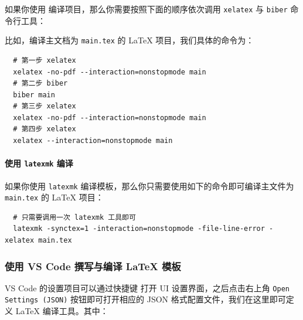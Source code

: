 如果你使用  编译项目，那么你需要按照下面的顺序依次调用 \texttt{xelatex} 与 \texttt{biber} 命令行工具：

\begin{center}
\end{center}

比如，编译主文档为 \texttt{main.tex} 的 {\LaTeX} 项目，我们具体的命令为：

\begin{verbatim}
  # 第一步 xelatex
  xelatex -no-pdf --interaction=nonstopmode main
  # 第二步 biber
  biber main
  # 第三步 xelatex
  xelatex -no-pdf --interaction=nonstopmode main
  # 第四步 xelatex
  xelatex --interaction=nonstopmode main
\end{verbatim}

\paragraph{使用 \texttt{latexmk} 编译}

如果你使用 \texttt{latexmk} 编译模板，那么你只需要使用如下的命令即可编译主文件为 \texttt{main.tex} 的 {\LaTeX} 项目：

\begin{verbatim}
  # 只需要调用一次 latexmk 工具即可
  latexmk -synctex=1 -interaction=nonstopmode -file-line-error -xelatex main.tex
\end{verbatim}

\subsubsection{使用 VS Code 撰写与编译 {\LaTeX} 模板}

VS Code 的设置项目可以通过快捷键  打开 UI 设置界面，之后点击右上角 \texttt{Open Settings (JSON)} 按钮即可打开相应的 JSON 格式配置文件，我们在这里即可定义 {\LaTeX} 编译工具。其中：

